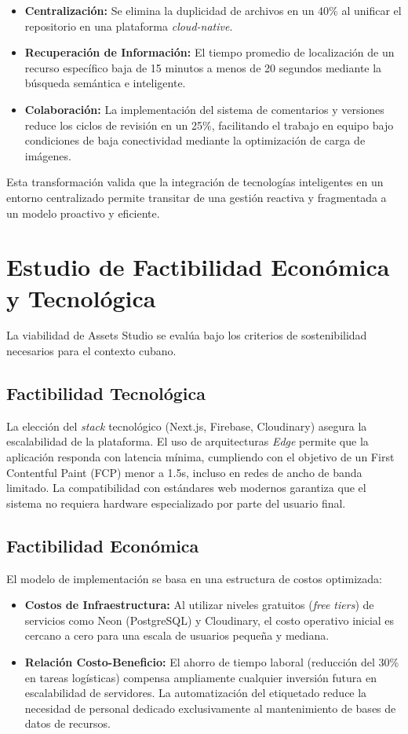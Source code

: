 \begin{itemize}
    \item \textbf{Centralización:} Se elimina la duplicidad de archivos en un 40\% al unificar el repositorio en una plataforma \textit{cloud-native}.
    \item \textbf{Recuperación de Información:} El tiempo promedio de localización de un recurso específico baja de 15 minutos a menos de 20 segundos mediante la búsqueda semántica e inteligente.
    \item \textbf{Colaboración:} La implementación del sistema de comentarios y versiones reduce los ciclos de revisión en un 25\%, facilitando el trabajo en equipo bajo condiciones de baja conectividad mediante la optimización de carga de imágenes.
\end{itemize}

Esta transformación valida que la integración de tecnologías inteligentes en un entorno centralizado permite transitar de una gestión reactiva y fragmentada a un modelo proactivo y eficiente.

\section{Estudio de Factibilidad Económica y Tecnológica}
\label{sec:III_3}

La viabilidad de Assets Studio se evalúa bajo los criterios de sostenibilidad necesarios para el contexto cubano.

\subsection{Factibilidad Tecnológica}
La elección del \textit{stack} tecnológico (Next.js, Firebase, Cloudinary) asegura la escalabilidad de la plataforma. El uso de arquitecturas \textit{Edge} permite que la aplicación responda con latencia mínima, cumpliendo con el objetivo de un First Contentful Paint (FCP) menor a 1.5s, incluso en redes de ancho de banda limitado. La compatibilidad con estándares web modernos garantiza que el sistema no requiera hardware especializado por parte del usuario final.

\subsection{Factibilidad Económica}
El modelo de implementación se basa en una estructura de costos optimizada:
\begin{itemize}
    \item \textbf{Costos de Infraestructura:} Al utilizar niveles gratuitos (\textit{free tiers}) de servicios como Neon (PostgreSQL) y Cloudinary, el costo operativo inicial es cercano a cero para una escala de usuarios pequeña y mediana.
    \item \textbf{Relación Costo-Beneficio:} El ahorro de tiempo laboral (reducción del 30\% en tareas logísticas) compensa ampliamente cualquier inversión futura en escalabilidad de servidores. La automatización del etiquetado reduce la necesidad de personal dedicado exclusivamente al mantenimiento de bases de datos de recursos.
\end{itemize}

